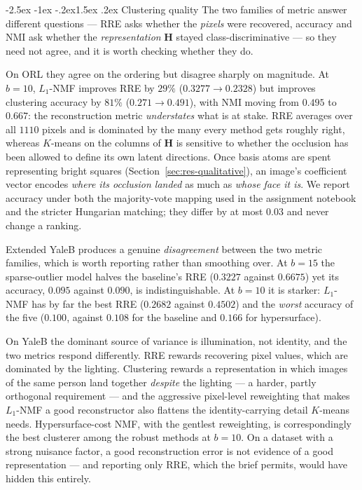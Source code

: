 \documentclass[12pt,a4paper]{article}
\makeatletter
\renewcommand\subsection{\@startsection{subsection}{2}{\z@}%
    {-2.5ex \@plus -1ex \@minus -.2ex}{1.5ex \@plus.2ex}%
    {\normalfont\fontsize{12}{14}\bfseries}}
\newcommand{\bH}{\bm{H}}
\makeatother
\begin{document}
\subsection{Clustering quality}
The two families of metric answer different questions --- RRE asks whether the
\emph{pixels} were recovered, accuracy and NMI ask whether the
\emph{representation} $\bH$ stayed class-discriminative --- so they need not
agree, and it is worth checking whether they do.

On ORL they agree on the ordering but disagree sharply on magnitude. At $b=10$,
$L_1$-NMF improves RRE by $29\%$ ($0.3277 \to 0.2328$) but improves clustering
accuracy by $81\%$ ($0.271 \to 0.491$), with NMI moving from $0.495$ to
$0.667$: the reconstruction metric \emph{understates} what is at stake. RRE
averages over all $1110$ pixels and is dominated by the many every method gets
roughly right, whereas $K$-means on the columns of $\bH$ is sensitive to
whether the occlusion has been allowed to define its own latent directions.
Once basis atoms are spent representing bright squares
(Section~\ref{sec:res-qualitative}), an image's coefficient vector encodes
\emph{where its occlusion landed} as much as \emph{whose face it is}. We report
accuracy under both the majority-vote mapping used in the assignment notebook
and the stricter Hungarian matching; they differ by at most $0.03$ and never
change a ranking.

Extended YaleB produces a genuine \emph{disagreement} between the two metric
families, which is worth reporting rather than smoothing over. At $b=15$ the
sparse-outlier model halves the baseline's RRE ($0.3227$ against $0.6675$) yet
its accuracy, $0.095$ against $0.090$, is indistinguishable. At $b=10$ it is
starker: $L_1$-NMF has by far the best RRE ($0.2682$ against $0.4502$) and the
\emph{worst} accuracy of the five ($0.100$, against $0.108$ for the baseline
and $0.166$ for hypersurface).

On YaleB the dominant source of variance is illumination, not identity, and the
two metrics respond differently. RRE rewards recovering pixel values, which are
dominated by the lighting. Clustering rewards a representation in which images
of the same person land together \emph{despite} the lighting --- a harder,
partly orthogonal requirement --- and the aggressive pixel-level reweighting
that makes $L_1$-NMF a good reconstructor also flattens the identity-carrying
detail $K$-means needs. Hypersurface-cost NMF, with the gentlest reweighting,
is correspondingly the best clusterer among the robust methods at $b=10$. On a
dataset with a strong nuisance factor, a good reconstruction error is not
evidence of a good representation --- and reporting only RRE, which the brief
permits, would have hidden this entirely.
\end{document}
